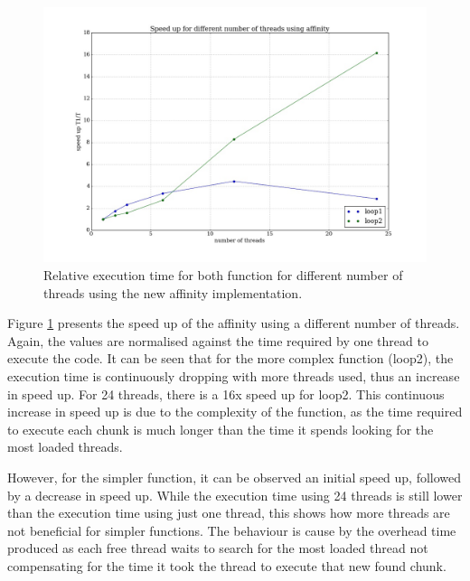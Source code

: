 \documentclass[12pt]{article}
\begin{document}
	\begin{figure}[H]	
		\centering
		\includegraphics[scale=0.4]{speed_up_af.jpeg}
		\caption{Relative execution time for both function for different number of threads using the new affinity implementation.}\label{upaf}
	\end{figure}

	Figure \ref{upaf} presents the speed up of the affinity using a different number of threads. Again, the values are normalised against the time required by one thread to execute the code. It can be seen that for the more complex function (loop2), the execution time is continuously dropping with more threads used, thus an increase in speed up. For 24 threads, there is a 16x speed up for loop2. This continuous increase in speed up is due to the complexity of the function, as the time required to execute each chunk is much longer than the time it spends looking for the most loaded threads. 
	
	However, for the simpler function, it can be observed an initial speed up, followed by a decrease in speed up. While the execution time using 24 threads is still lower than the execution time using just one thread, this shows how more threads are not beneficial for simpler functions. The behaviour is cause by the overhead time produced as each free thread waits to search for the most loaded thread not compensating for the time it took the thread to execute that new found chunk. 
\end{document}
